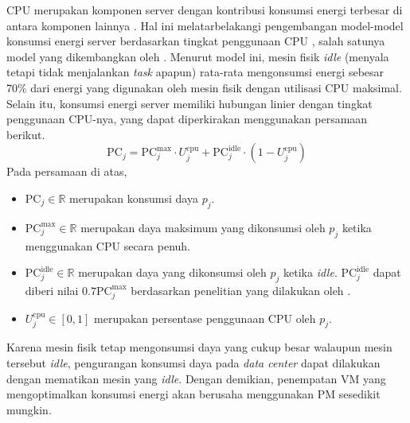CPU merupakan komponen server dengan kontribusi konsumsi energi terbesar di antara komponen lainnya \citep{VasquesMouraAlmeida2019}. Hal ini melatarbelakangi pengembangan model-model konsumsi energi server berdasarkan tingkat penggunaan CPU \citep{Jin2020}, salah satunya model yang dikembangkan oleh \citet{BeloglazlovAbawajyBuyya2012}. Menurut model ini, mesin fisik \textit{idle} (menyala tetapi tidak menjalankan \textit{task} apapun) rata-rata mengonsumsi energi sebesar 70\% dari energi yang digunakan oleh mesin fisik dengan utilisasi CPU maksimal. Selain itu, konsumsi energi server memiliki hubungan linier dengan tingkat penggunaan CPU-nya, yang dapat diperkirakan menggunakan persamaan berikut.
\[
\text{PC}_j=\text{PC}_j^{\max} \cdot U_j^\text{cpu} +\text{PC}_j^\text{idle} \cdot (1- U_j^\text{cpu})
\]
Pada persamaan di atas,
\begin{itemize}
  \item {$\text{PC}_j \in \mathbb{R}$ merupakan konsumsi daya $p_j$.}
  \item {$\text{PC}_j^\text{max} \in \mathbb{R}$ merupakan daya maksimum yang dikonsumsi oleh $p_j$ ketika menggunakan CPU secara penuh.}
  \item {$\text{PC}_j^\text{idle} \in \mathbb{R}$ merupakan daya yang dikonsumsi oleh $p_j$ ketika \textit{idle}. $\text{PC}_j^\text{idle}$ dapat diberi nilai $0.7\text{PC}_j^\max$ berdasarkan penelitian yang dilakukan oleh \citet{BeloglazlovAbawajyBuyya2012}.}
  \item {$U_j^\text{cpu} \in [0,1]$ merupakan persentase penggunaan CPU oleh $p_j$.}   
\end{itemize}

Karena mesin fisik tetap mengonsumsi daya yang cukup besar walaupun mesin tersebut \textit{idle}, pengurangan konsumsi daya pada \textit{data center} dapat dilakukan dengan mematikan mesin yang \textit{idle}. Dengan demikian, penempatan VM yang mengoptimalkan konsumsi energi akan berusaha menggunakan PM sesedikit mungkin.
